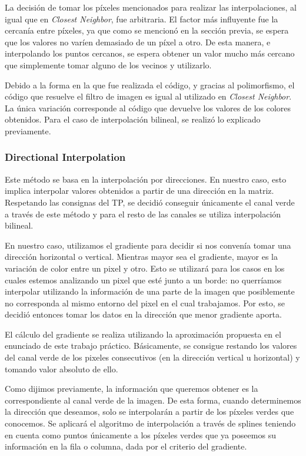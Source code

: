 La decisión de tomar los píxeles mencionados para realizar las interpolaciones, al igual que en \textit{Closest Neighbor}, fue arbitraria. El factor más influyente fue la cercanía entre píxeles, ya que como se mencionó en la sección previa, se espera que los valores no varíen demasiado de un píxel a otro. De esta manera, e interpolando los puntos cercanos, se espera obtener un valor mucho más cercano que simplemente tomar alguno de los vecinos y utilizarlo.
\par 
Debido a la forma en la que fue realizada el código, y gracias al polimorfismo, el código que resuelve el filtro de imagen es igual al utilizado en \textit{Closest Neighbor}. La única variación corresponde al código que devuelve los valores de los colores obtenidos. Para el caso de interpolación bilineal, se realizó lo explicado previamente.

\subsubsection{Directional Interpolation}

Este método se basa en la interpolación por direcciones. En nuestro caso, esto implica interpolar valores obtenidos a partir de una dirección en la matriz. Respetando las consignas del TP, se decidió conseguir únicamente el canal verde a través de este método y para el resto de las canales se utiliza interpolación bilineal.
\par 
En nuestro caso, utilizamos el gradiente para decidir si nos convenía tomar una dirección horizontal o vertical. Mientras mayor sea el gradiente, mayor es la variación de color entre un pixel y otro. Esto se utilizará para los casos en los cuales estemos analizando un pixel que esté junto a un borde: no querríamos interpolar utilizando la información de una parte de la imagen que posiblemente no corresponda al mismo entorno del pixel en el cual trabajamos. Por esto, se decidió entonces tomar los datos en la dirección que menor gradiente aporta. 

El cálculo del gradiente se realiza utilizando la aproximación propuesta en el enunciado de este trabajo práctico. Básicamente, se consigue restando los valores del canal verde de los pixeles consecutivos (en la dirección vertical u horizontal) y tomando valor absoluto de ello.

Como dijimos previamente, la información que queremos obtener es la correspondiente al canal verde de la imagen. De esta forma, cuando determinemos la dirección que deseamos, solo se interpolarán a partir de los píxeles verdes que conocemos. Se aplicará el algoritmo de interpolación a través de splines teniendo en cuenta como puntos únicamente a los píxeles verdes que ya poseemos su información en la fila o columna, dada por el criterio del gradiente.


